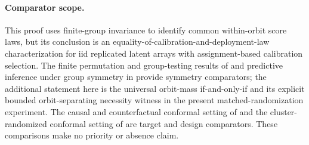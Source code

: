 \paragraph{Comparator scope.} This proof uses finite-group invariance to identify common within-orbit score laws, but its conclusion is an equality-of-calibration-and-deployment-law characterization for iid replicated latent arrays with assignment-based calibration selection. The finite permutation and group-testing results of \cite{HemerikGoeman2018,RamdasBarberCandesTibshirani2023} and predictive inference under group symmetry in \cite{DobribanYu2025} provide symmetry comparators; the additional statement here is the universal orbit-mass if-and-only-if and its explicit bounded orbit-separating necessity witness in the present matched-randomization experiment. The causal and counterfactual conformal setting of \cite{LeiCandes2021} and the cluster-randomized conformal setting of \cite{WangLiYu2025} are target and design comparators. These comparisons make no priority or absence claim.